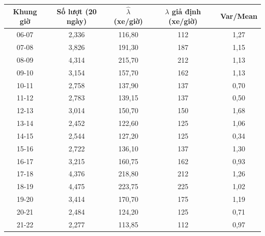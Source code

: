 \begin{tabular}{ccccc}
\toprule
\textbf{Khung giờ} & \textbf{Số lượt (20 ngày)} & \textbf{$\hat{\lambda}$ (xe/giờ)} & \textbf{$\lambda$ giả định (xe/giờ)} & \textbf{Var/Mean} \\
\midrule
06-07 & 2,336 & 116{,}80 & 112 & 1{,}27 \\
07-08 & 3,826 & 191{,}30 & 187 & 1{,}15 \\
08-09 & 4,314 & 215{,}70 & 212 & 1{,}13 \\
09-10 & 3,154 & 157{,}70 & 162 & 1{,}13 \\
10-11 & 2,758 & 137{,}90 & 137 & 0{,}70 \\
11-12 & 2,783 & 139{,}15 & 137 & 0{,}50 \\
12-13 & 3,014 & 150{,}70 & 150 & 1{,}68 \\
13-14 & 2,452 & 122{,}60 & 125 & 1{,}06 \\
14-15 & 2,544 & 127{,}20 & 125 & 0{,}34 \\
15-16 & 2,722 & 136{,}10 & 137 & 1{,}30 \\
16-17 & 3,215 & 160{,}75 & 162 & 0{,}93 \\
17-18 & 4,376 & 218{,}80 & 212 & 1{,}26 \\
18-19 & 4,475 & 223{,}75 & 225 & 1{,}02 \\
19-20 & 3,414 & 170{,}70 & 175 & 1{,}19 \\
20-21 & 2,484 & 124{,}20 & 125 & 0{,}71 \\
21-22 & 2,277 & 113{,}85 & 112 & 0{,}97 \\
\bottomrule
\end{tabular}
